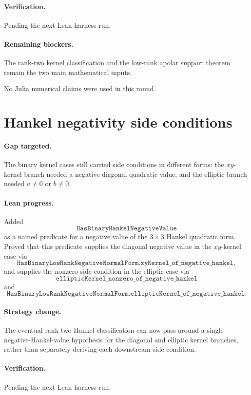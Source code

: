 \documentclass[11pt]{article}
\begin{document}
\paragraph{Verification.}
Pending the next Lean harness run.

\paragraph{Remaining blockers.}
The rank-two kernel classification and the low-rank apolar support theorem
remain the two main mathematical inputs.

No Julia numerical claims were used in this round.

\section*{Hankel negativity side conditions}

\paragraph{Gap targeted.}
The binary kernel cases still carried side conditions in different forms:
the \(xy\)-kernel branch needed a negative diagonal quadratic value, and the
elliptic branch needed \(a\ne0\) or \(b\ne0\).

\paragraph{Lean progress.}
Added
\[
\texttt{HasBinaryHankelNegativeValue}
\]
as a named predicate for a negative value of the \(3\times3\) Hankel quadratic
form.  Proved that this predicate supplies the diagonal negative value in the
\(xy\)-kernel case via
\[
\texttt{HasBinaryLowRankNegativeNormalForm.xyKernel\_of\_negative\_hankel},
\]
and supplies the nonzero side condition in the elliptic case via
\[
\texttt{ellipticKernel\_nonzero\_of\_negative\_hankel}
\]
and
\[
\texttt{HasBinaryLowRankNegativeNormalForm.ellipticKernel\_of\_negative\_hankel}.
\]

\paragraph{Strategy change.}
The eventual rank-two Hankel classification can now pass around a single
negative-Hankel-value hypothesis for the diagonal and elliptic kernel branches,
rather than separately deriving each downstream side condition.

\paragraph{Verification.}
Pending the next Lean harness run.
\end{document}
